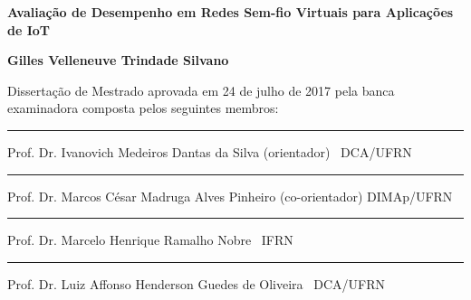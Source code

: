 %
%

\begin{titlepage}

\begin{center}

\LARGE

	\textbf{Avaliação de Desempenho em Redes Sem-fio Virtuais para Aplicações de IoT}

\vfill

\Large

\textbf{Gilles Velleneuve Trindade Silvano}

\end{center}

\vfill

\noindent
Dissertação de Mestrado
aprovada em 24 de julho de 2017 pela banca examinadora composta
pelos seguintes membros:


\begin{center}

\vspace{1.5cm}\rule{0.95\linewidth}{1pt}
\parbox{0.9\linewidth}{%
Prof. Dr. Ivanovich Medeiros Dantas da Silva (orientador) \dotfill\ DCA/UFRN}

\vspace{1.5cm}\rule{0.95\linewidth}{1pt}
\parbox{0.9\linewidth}{%
Prof. Dr. Marcos César Madruga Alves Pinheiro (co-orientador) \dotfill DIMAp/UFRN}

\vspace{1.5cm}\rule{0.95\linewidth}{1pt}
\parbox{0.9\linewidth}{%
Prof. Dr. Marcelo Henrique Ramalho Nobre \dotfill\ IFRN}

\vspace{1.5cm}\rule{0.95\linewidth}{1pt}
\parbox{0.9\linewidth}{%
Prof. Dr. Luiz Affonso Henderson Guedes de Oliveira \dotfill\ DCA/UFRN}

\end{center}

\end{titlepage}

